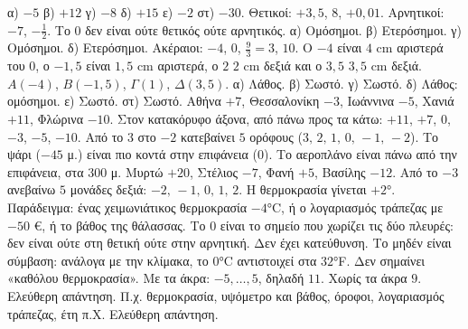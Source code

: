  α) $-5$ \quad β) $+12$ \quad γ) $-8$ \quad δ) $+15$ \quad ε) $-2$ \quad στ) $-30$.
 Θετικοί: $+3{,}5$, $8$, $+0{,}01$. Αρνητικοί: $-7$, $-\frac{1}{2}$. Το $0$ δεν είναι ούτε θετικός ούτε αρνητικός.
 α) Ομόσημοι. β) Ετερόσημοι. γ) Ομόσημοι. δ) Ετερόσημοι.
 Ακέραιοι: $-4$, $0$, $\frac{9}{3}=3$, $10$.
 Ο $-4$ είναι $4$ cm αριστερά του $0$, ο $-1{,}5$ είναι $1{,}5$ cm αριστερά, ο $2$ $2$ cm δεξιά και ο $3{,}5$ $3{,}5$ cm δεξιά.
 $A(-4)$, $B(-1{,}5)$, $\Gamma(1)$, $\Delta(3{,}5)$.
 α) Λάθος. β) Σωστό. γ) Σωστό. δ) Λάθος: ομόσημοι. ε) Σωστό. στ) Σωστό.
 Αθήνα $+7$, Θεσσαλονίκη $-3$, Ιωάννινα $-5$, Χανιά $+11$, Φλώρινα $-10$. Στον κατακόρυφο άξονα, από πάνω προς τα κάτω: $+11$, $+7$, $0$, $-3$, $-5$, $-10$.
 Από το $3$ στο $-2$ κατεβαίνει $5$ ορόφους ($3,\,2,\,1,\,0,\,-1,\,-2$).
 Το ψάρι ($-45$ μ.) είναι πιο κοντά στην επιφάνεια ($0$). Το αεροπλάνο είναι πάνω από την επιφάνεια, στα $300$ μ.
 Μυρτώ $+20$, Στέλιος $-7$, Φανή $+5$, Βασίλης $-12$.
 Από το $-3$ ανεβαίνω $5$ μονάδες δεξιά: $-2,\,-1,\,0,\,1,\,2$. Η θερμοκρασία γίνεται $+2$°.
 Παράδειγμα: ένας χειμωνιάτικος θερμοκρασία $-4$°C, ή ο λογαριασμός τράπεζας με $-50$ €, ή το βάθος της θάλασσας.
 Το $0$ είναι το σημείο που χωρίζει τις δύο πλευρές: δεν είναι ούτε στη θετική ούτε στην αρνητική. Δεν έχει κατεύθυνση.
 Το μηδέν είναι σύμβαση: ανάλογα με την κλίμακα, το $0$°C αντιστοιχεί στα $32$°F. Δεν σημαίνει «καθόλου θερμοκρασία».
 Με τα άκρα: $-5,\dots,5$, δηλαδή $11$. Χωρίς τα άκρα $9$.
 Ελεύθερη απάντηση. Π.χ. θερμοκρασία, υψόμετρο και βάθος, όροφοι, λογαριασμός τράπεζας, έτη π.Χ.
 Ελεύθερη απάντηση.
